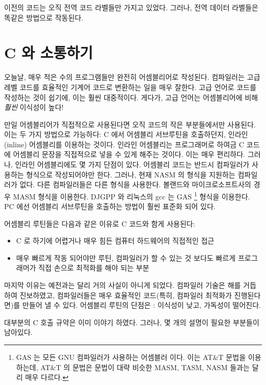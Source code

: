 이전의 코드는 오직 전역 코드 라벨들만 가지고 있었다.
그러나, 전역 데이터 라벨들은 똑같은 방법으로 작동된다. 


\section{C 와 소통하기}

오늘날, 매우 적은 수의 프로그램들만 완전히 어셈블리어로 작성된다. 컴파일러는
고급 레벨 코드를 효율적인 기계어 코드로 변환하는 일을 매우 잘한다. 고급 언어로
코드를 작성하는 것이 쉽기에, 이는 훨씬 대중적이다. 게다가, 고급 언어는 어셈블리어에
비해 \emph{훨씬} 이식성이 높다!

만일 어셈블리어가 직접적으로 사용된다면 오직 코드의 작은 부분들에서만 사용된다. 
이는 두 가지 방법으로 가능하다: C 에서 어셈블리 서브루틴을 호출하던지, 인라인(inline)
어셈블리를 이용하는 것이다. 인라인 어셈블리는 프로그래머로 하여금 C 코드에 어셈블리
문장을 직접적으로 넣을 수 있게 해주는 것이다. 이는 매우 편리하다. 그러나, 인라인 어셈블리에도
몇 가지 단점이 있다. 어셈블리 코드는 반드시 컴파일러가 사용하는 형식으로 작성되어야만
한다. 그러나, 현재 NASM 의 형식을 지원하는 컴파일러가 없다. 다른 컴파일러들은
다른 형식을 사용한다. 볼랜드와 마이크로소프트사의 경우 MASM 형식을 이용한다. 
DJGPP 와 리눅스의 gcc 는 GAS \footnote{GAS 는 모든 GNU 컴파일러가 사용하는 어셈블러
이다. 이는 AT\&T 문법을 이용하는데, AT\&T 의 문법은 문법이 대략 비슷한 MASM, TASM, NASM 들과는 
달리 매우 다르다.} 형식을 이용한다. PC 에선 어셈블리 서브루틴을 호출하는 방법이 
훨씬 표준화 되어 있다. 

어셈블리 루틴들은 다음과 같은 이유로 C 코드와 함게 사용된다:

\begin{itemize}
\item C 로 하기에 어렵거나 매우 힘든 컴퓨터 하드웨어의 
      직접적인 접근 
\item 매우 빠르게 작동 되어야만 루틴, 컴파일러가 할 수 있는 것  
      보다도 빠르게 프로그래머가 직접 손으로 최적화를 해야 되는 부분 
\end{itemize}

마지막 이유는 예전과는 달리 거의 사실이 아니게 되었다. 컴파일러 기술은 해를
거듭하여 진보하였고, 컴파일러들은 매우 효율적인 코드(특히, 컴파일러 최적화가
진행된다면)를 만들어 낼 수 있다. 어셈블리 루틴의 단점은 : 이식성이 낮고,
가독성이 떨어진다. 

대부분의 C 호출 규약은 이미 이야기 하였다. 그러나, 몇 개의 설명이 필요한
부분들이 남아있다. 

